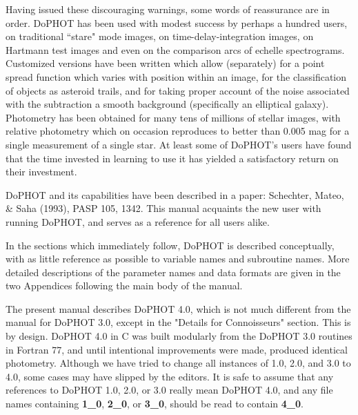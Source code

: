 Having issued these discouraging warnings, some words of
reassurance are in order.  DoPHOT has been used with modest
success by perhaps a hundred users, on traditional ``stare" mode
images, on time-delay-integration images, on Hartmann test
images and even on the comparison arcs of echelle
spectrograms.  Customized versions have been written which
allow (separately) for a point spread function which varies
with position within an image, for the classification of
objects as asteroid trails, and for taking proper account
of the noise associated with the subtraction a smooth
background (specifically an elliptical galaxy).  Photometry
has been obtained for many tens of millions of stellar images, with
relative photometry which on occasion reproduces to better
than 0.005 mag for a single measurement of a single star. At
least some of DoPHOT's users have found that the time
invested in learning to use it has yielded a satisfactory
return on their investment.

DoPHOT and its capabilities have been described in a paper: Schechter, Mateo,
\& Saha (1993), PASP 105, 1342. This manual acquaints the new user with 
running DoPHOT, and serves as a reference for all users alike. 
 
In the sections which immediately follow, DoPHOT is
described conceptually, with as little reference as possible
to variable names and subroutine names.  More detailed descriptions
of the parameter names and data formats are given in the two
Appendices following the main body of the manual.

The present manual describes DoPHOT 4.0, which is not much different from 
the manual for DoPHOT 3.0, except in the "Details for Connoisseurs" section.
This is by design.  DoPHOT 4.0 in C was built modularly from the DoPHOT 3.0 
routines in Fortran 77, and until intentional improvements were made, 
produced identical photometry. Although we have tried to change all instances 
of 1.0, 2.0, and 3.0 to 4.0, some cases may have slipped by the editors.
It is safe to assume that any references to DoPHOT 1.0, 2.0, or 3.0 really mean 
DoPHOT 4.0, and any file names containing {\bf 1\_0}, {\bf 2\_0}, or {\bf 3\_0}, 
should be read to contain {\bf 4\_0}.



